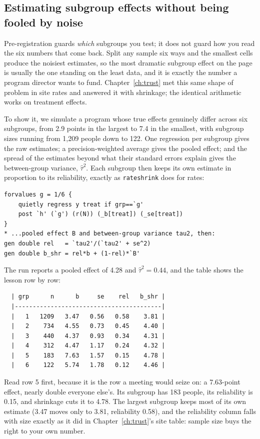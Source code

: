 \subsection{Estimating subgroup effects without being fooled by noise}\label{ch08-sc-shrinkfx}
Pre-registration guards \emph{which} subgroups you test; it does not guard how you read the six numbers that come back. Split any sample six ways and the smallest cells produce the noisiest estimates, so the most dramatic subgroup effect on the page is usually the one standing on the least data, and it is exactly the number a program director wants to fund. Chapter~\ref{ch:trust} met this same shape of problem in site rates and answered it with shrinkage; the identical arithmetic works on treatment effects.

To show it, we simulate a program whose true effects genuinely differ across six subgroups, from 2.9 points in the largest to 7.4 in the smallest, with subgroup sizes running from 1{,}209 people down to 122. One regression per subgroup gives the raw estimates; a precision-weighted average gives the pooled effect; and the spread of the estimates beyond what their standard errors explain gives the between-group variance, $\hat\tau^2$. Each subgroup then keeps its own estimate in proportion to its reliability, exactly as \texttt{rateshrink} does for rates:
\par
{\footnotesize
\begin{verbatim}
forvalues g = 1/6 {
    quietly regress y treat if grp==`g'
    post `h' (`g') (r(N)) (_b[treat]) (_se[treat])
}
* ...pooled effect B and between-group variance tau2, then:
gen double rel   = `tau2'/(`tau2' + se^2)
gen double b_shr = rel*b + (1-rel)*`B'
\end{verbatim}
}
The run reports a pooled effect of 4.28 and $\hat\tau^2 = 0.44$, and the table shows the lesson row by row:
\par
{\footnotesize
\begin{verbatim}
  | grp      n      b     se    rel   b_shr |
  |-----------------------------------------|
  |   1   1209   3.47   0.56   0.58    3.81 |
  |   2    734   4.55   0.73   0.45    4.40 |
  |   3    440   4.37   0.93   0.34    4.31 |
  |   4    312   4.47   1.17   0.24    4.32 |
  |   5    183   7.63   1.57   0.15    4.78 |
  |   6    122   5.74   1.78   0.12    4.46 |
\end{verbatim}
}
Read row 5 first, because it is the row a meeting would seize on: a 7.63-point effect, nearly double everyone else's. Its subgroup has 183 people, its reliability is 0.15, and shrinkage cuts it to 4.78. The largest subgroup keeps most of its own estimate (3.47 moves only to 3.81, reliability 0.58), and the reliability column falls with size exactly as it did in Chapter~\ref{ch:trust}'s site table: sample size buys the right to your own number.

